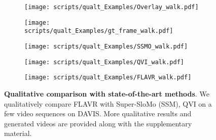 \documentclass[10pt,twocolumn,letterpaper]{article}
\newcommand{\red}[1]{{#1}}
\newcommand{\Ours}{FLAVR}
\begin{document}
\begin{table*}[!t]
\begin{figure}[t]
\begin{center}
    \begin{subfigure}[b]{0.09\textwidth}
        \centering
        \texttt{[image: scripts/qualt\_Examples/Overlay\_walk.pdf]}
        \captionsetup{width=\textwidth}
    \end{subfigure}
    \hfill
    \begin{subfigure}[b]{0.09\textwidth}
        \centering
        \texttt{[image: scripts/qualt\_Examples/gt\_frame\_walk.pdf]}
        \captionsetup{width=\textwidth}
    \end{subfigure}
    \hfill
    \begin{subfigure}[b]{0.09\textwidth}
        \centering
        \texttt{[image: scripts/qualt\_Examples/SSMO\_walk.pdf]}
    \end{subfigure}
    \hfill
    \begin{subfigure}[b]{0.09\textwidth}
        \centering
        \texttt{[image: scripts/qualt\_Examples/QVI\_walk.pdf]}
        \captionsetup{width=\textwidth}
    \end{subfigure}
    \hfill
    \begin{subfigure}[b]{0.09\textwidth}
        \centering
        \texttt{[image: scripts/qualt\_Examples/FLAVR\_walk.pdf]}
        \captionsetup{width=\textwidth}
        \subcaption{\Ours{}}
    \end{subfigure}
    \end{center}
\caption{{\bf Qualitative comparison with state-of-the-art methods}. We qualitatively compare FLAVR with Super-SloMo (SSM), QVI on a few video sequences on DAVIS. More qualitative results and generated videos are provided along with the \red{supplementary} material.}
    \label{fig:qualt_figs}
    \vspace{-12pt}
\end{figure} \begin{table*}[!t]\begin{subtable}[b]{.35\textwidth} \centering



\end{subtable}
\end{table*}
\end{table*}
\end{document}
